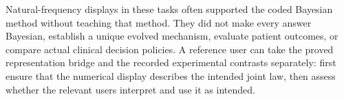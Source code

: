 Natural-frequency displays in these tasks often supported the coded Bayesian
method without teaching that method. They did not make every answer Bayesian,
establish a unique evolved mechanism, evaluate patient outcomes, or compare
actual clinical decision policies. A reference user can take the proved
representation bridge and the recorded experimental contrasts separately:
first ensure that the numerical display describes the intended joint law,
then assess whether the relevant users interpret and use it as intended.
